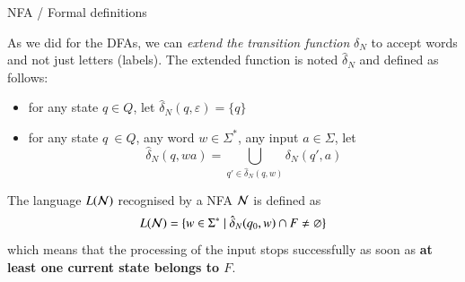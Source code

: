 \documentclass[compress,dvips,xcolor={dvipsnames},t]{beamer}
\begin{document}
%
\begin{frame}{NFA / Formal definitions}

As we did for the DFAs, we can \emph{extend the transition function}
\(\delta_N\) to accept words and not just letters (labels). The extended
function is noted \(\hat{\delta}_N\) and defined as follows:
\begin{itemize}

  \item for any state \(q \in Q\), let \(\hat{\delta}_N (q,
  \varepsilon) = \{q\}\)

  \item for any state \(q\ \in Q\), any word \(w \in \Sigma^{*}\), any
    input \(a \in \Sigma\), let \[\hat{\delta}_N (q, wa) = \bigcup_{q'
      \in \hat{\delta}_N (q, w)}{\delta_N (q', a)}\]
\end{itemize}
The language \(L({\cal N})\) recognised by a NFA \(\cal N\) is
defined as
\[
L({\cal N}) = \{w \in \Sigma^{*} \; \lvert \; \hat{\delta}_N (q_0, w)
\cap F \neq \varnothing\}
\]
which means that the processing of the input stops successfully as
soon as \textbf{at least one current state belongs to \(F\)}.

\end{frame}
\end{document}
